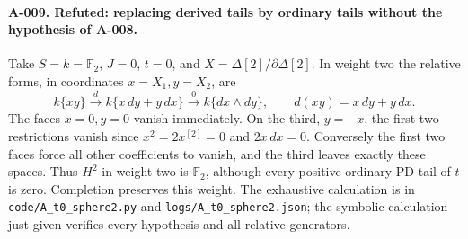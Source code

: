 \paragraph{A-009. Refuted: replacing derived tails by ordinary tails
without the hypothesis of A-008.}
Take $S=k=\mathbb F_2$, $J=0$, $t=0$, and
$X=\Delta[2]/\partial\Delta[2]$. In weight two the relative forms,
in coordinates $x=X_1,y=X_2$, are
\[
 k\{xy\}\xrightarrow{d}k\{x\,dy+y\,dx\}
                  \xrightarrow{0}k\{dx\wedge dy\},
 \qquad d(xy)=x\,dy+y\,dx.
\]
The faces $x=0,y=0$ vanish immediately. On the third, $y=-x$,
the first two restrictions vanish since $x^2=2x^{[2]}=0$ and
$2x\,dx=0$. Conversely the first two faces force all other
coefficients to vanish, and the third leaves exactly these spaces.
Thus $H^2$ in weight two is $\mathbb F_2$, although every positive
ordinary PD tail of $t$ is zero. Completion preserves this weight.
The exhaustive calculation is in \texttt{code/A\_t0\_sphere2.py}
and \texttt{logs/A\_t0\_sphere2.json}; the symbolic calculation
just given verifies every hypothesis and all relative generators.
